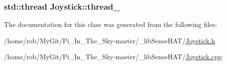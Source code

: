 \subsubsection[{\texorpdfstring{thread\+\_\+}{thread_}}]{\setlength{\rightskip}{0pt plus 5cm}std\+::thread Joystick\+::thread\+\_\+\hspace{0.3cm}{\ttfamily [protected]}}\hypertarget{class_joystick_a885c832d840018ec59c82f081fa18060}{}\label{class_joystick_a885c832d840018ec59c82f081fa18060}


The documentation for this class was generated from the following files\+:\begin{DoxyCompactItemize}
\item 
/home/rob/\+My\+Git/\+Pi\+\_\+\+In\+\_\+\+The\+\_\+\+Sky-\/master/\+\_\+lib\+Sense\+H\+A\+T/\hyperlink{_joystick_8h}{Joystick.\+h}\item 
/home/rob/\+My\+Git/\+Pi\+\_\+\+In\+\_\+\+The\+\_\+\+Sky-\/master/\+\_\+lib\+Sense\+H\+A\+T/\hyperlink{_joystick_8cpp}{Joystick.\+cpp}\end{DoxyCompactItemize}
